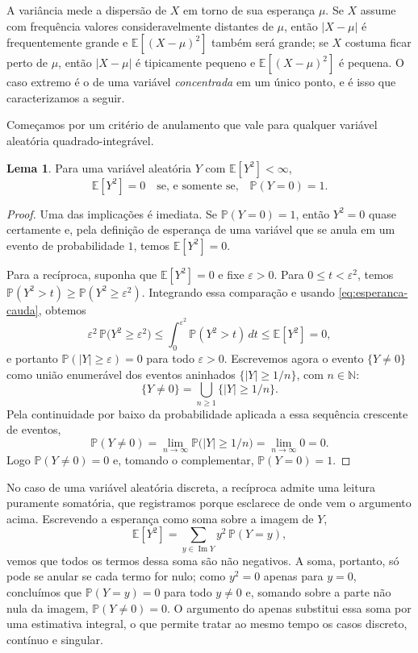 \documentclass[12pt,portuguese]{article}
\theoremstyle{definition}
\newtheorem{lemma}[lemma]{Lema}
\theoremstyle{plainexercise}
\theoremstyle{starredexercise}
\theoremstyle{definition}
\begin{document}
A variância mede a dispersão de $X$ em torno de sua esperança $\mu$. Se $X$
assume com frequência valores consideravelmente distantes de $\mu$, então
$|X-\mu|$ é frequentemente grande e $\mathbb{E}[(X-\mu)^2]$ também será grande;
se $X$ costuma ficar perto de $\mu$, então $|X-\mu|$ é tipicamente pequeno e
$\mathbb{E}[(X-\mu)^2]$ é pequena. O caso extremo é o de uma variável
\emph{concentrada} em um único ponto, e é isso que caracterizamos a seguir.

Começamos por um critério de anulamento que vale para qualquer variável
aleatória quadrado-integrável.

\begin{lemma}\label{lem:segundo-momento-zero}
Para uma variável aleatória $Y$ com $\mathbb{E}[Y^2]<\infty$,
\begin{equation}\label{eq:variancia-zero}
\mathbb{E}[Y^2]=0
\quad\text{se, e somente se,}\quad
\mathbb{P}(Y=0)=1.
\end{equation}
\end{lemma}

\begin{proof}
Uma das implicações é imediata. Se $\mathbb{P}(Y=0)=1$, então $Y^2=0$ quase
certamente e, pela definição de esperança de uma variável que se anula em um
evento de probabilidade $1$, temos $\mathbb{E}[Y^2]=0$.

Para a recíproca, suponha que $\mathbb{E}[Y^2]=0$ e fixe
$\varepsilon>0$. Para $0\leqslant t<\varepsilon^2$, temos
$\mathbb{P}(Y^2>t)\geqslant\mathbb{P}(Y^2\geqslant\varepsilon^2)$.
Integrando essa comparação e usando \eqref{eq:esperanca-cauda}, obtemos
\[
\varepsilon^2\,\mathbb{P}\bigl(Y^2\geqslant\varepsilon^2\bigr)
\leqslant\int_0^{\varepsilon^2}\mathbb{P}(Y^2>t)\,dt
\leqslant \mathbb{E}[Y^2]=0,
\]
e portanto $\mathbb{P}(|Y|\geqslant\varepsilon)=0$ para todo
$\varepsilon>0$. Escrevemos agora o evento $\{Y\neq 0\}$ como união enumerável
dos eventos aninhados $\{|Y|\geqslant 1/n\}$, com $n\in\mathbb{N}$:
\[
\{Y\neq 0\}=\bigcup_{n\geqslant 1}\{|Y|\geqslant 1/n\}.
\]
Pela continuidade por baixo da probabilidade aplicada a essa sequência crescente de eventos,
\[
\mathbb{P}(Y\neq 0)
=\lim_{n\to\infty}\mathbb{P}\bigl(|Y|\geqslant 1/n\bigr)
=\lim_{n\to\infty} 0 = 0.
\]
Logo $\mathbb{P}(Y\neq 0)=0$ e, tomando o complementar,
$\mathbb{P}(Y=0)=1$.
\end{proof}

No caso de uma variável aleatória discreta, a recíproca admite uma leitura
puramente somatória, que registramos porque esclarece de onde vem o argumento
acima. Escrevendo a esperança como soma sobre a imagem de $Y$,
\[
\mathbb{E}[Y^2]=\sum_{y\in\operatorname{Im}Y}y^2\,\mathbb{P}(Y=y),
\]
vemos que todos os termos dessa soma são não negativos. A soma, portanto, só
pode se anular se cada termo for nulo; como $y^2=0$ apenas para $y=0$,
concluímos que $\mathbb{P}(Y=y)=0$ para todo $y\neq 0$ e, somando sobre a parte
não nula da imagem, $\mathbb{P}(Y\neq0)=0$. O argumento do
 apenas substitui essa soma por uma estimativa
integral, o que permite tratar ao mesmo tempo os casos discreto, contínuo e
singular.
\end{document}
